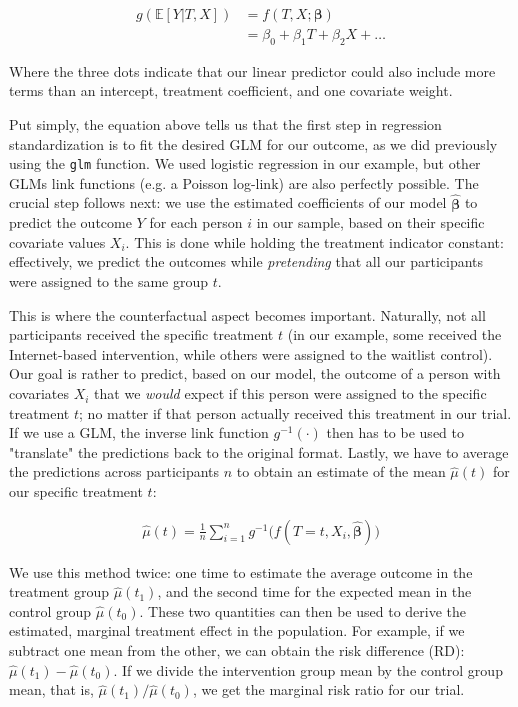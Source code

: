 \begin{align}
g(\mathbb{E}[Y|T,X]) &= f(T,X;\boldsymbol{\beta}) \\
                   ~ &= \beta_0 + \beta_1T + \beta_2X + \dots
\end{align}

Where the three dots indicate that our linear predictor could also include more terms than an intercept, treatment coefficient, and one covariate weight. 

Put simply, the equation above tells us that the first step in regression standardization is to fit the desired GLM for our outcome, as we did previously using the \texttt{glm} function. We used logistic regression in our example, but other GLMs link functions (e.g. a Poisson log-link) are also perfectly possible. The crucial step follows next: we use the estimated coefficients of our model $\boldsymbol{\hat\beta}$ to predict the outcome $Y$ for each person $i$ in our sample, based on their specific covariate values $X_i$. This is done while holding the treatment indicator constant: effectively, we predict the outcomes while \emph{pretending} that all our participants were assigned to the same group $t$. 

This is where the counterfactual aspect becomes important. Naturally, not all participants received the specific treatment $t$ (in our example, some received the Internet-based intervention, while others were assigned to the waitlist control). Our goal is rather to predict, based on our model, the outcome of a person with covariates $X_i$ that we \emph{would} expect if this person were assigned to the specific treatment $t$; no matter if that person actually received this treatment in our trial. If we use a GLM, the inverse link function $g^{-1}(\cdot)$ then has to be used to "translate" the predictions back to the original format. Lastly, we have to average the predictions across participants $n$ to obtain an estimate of the mean $\hat\mu(t)$ for our specific treatment $t$:

\begin{align}
\hat{\mu}(t) = \frac{1}{n}\sum_{i=1}^{n}g^{-1}\big(f(T=t,X_i,\boldsymbol{\hat\beta})\big)
\end{align}

We use this method twice: one time to estimate the average outcome in the treatment group $\hat\mu(t_1)$, and the second time for the expected mean in the control group $\hat\mu(t_0)$. These two quantities can then be used to derive the estimated, marginal treatment effect in the population. For example, if we subtract one mean from the other, we can obtain the risk difference (RD): $\hat\mu(t_1)-\hat\mu(t_0)$. If we divide the intervention group mean by the control group mean, that is, $\hat\mu(t_1)/\hat\mu(t_0)$, we get the marginal risk ratio for our trial. 

